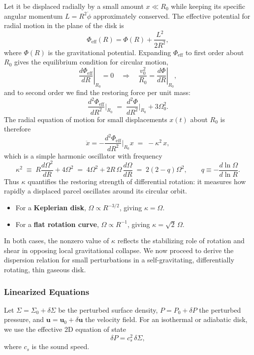 Let it be displaced radially by a small amount $x \ll R_0$ while keeping its specific angular momentum $L = R^2\dot{\phi}$ approximately conserved. The effective potential for radial motion in the plane of the disk is
\[
\Phi_{\text{eff}}(R) = \Phi(R) + \frac{L^2}{2R^2},
\]
where $\Phi(R)$ is the gravitational potential.  
Expanding $\Phi_{\text{eff}}$ to first order about $R_0$ gives the equilibrium condition for circular motion,
\[
\left.\frac{d\Phi_{\text{eff}}}{dR}\right|_{R_0} = 0 
\quad\Rightarrow\quad
\frac{v_0^2}{R_0} = \left.\frac{d\Phi}{dR}\right|_{R_0},
\]
and to second order we find the restoring force per unit mass:
\[
\frac{d^2\Phi_{\text{eff}}}{dR^2}\Big|_{R_0} \;=\;
\frac{d^2\Phi}{dR^2}\Big|_{R_0} + 3\Omega_0^2.
\]
The radial equation of motion for small displacements $x(t)$ about $R_0$ is therefore
\[
\ddot{x} = - \frac{d^2\Phi_{\text{eff}}}{dR^2}\Big|_{R_0} x
\;=\; -\kappa^2\,x,
\]
which is a simple harmonic oscillator with frequency
\[
\boxed{\kappa^2 \;\equiv\; R\frac{d\Omega^2}{dR} + 4\Omega^2
\;=\; 4\Omega^2 + 2R\,\Omega\,\frac{d\Omega}{dR}
\;=\; 2(2-q)\Omega^2, \qquad q \equiv -\frac{d\ln\Omega}{d\ln R}.}
\]
Thus $\kappa$ quantifies the restoring strength of differential rotation: 
it measures how rapidly a displaced parcel oscillates around its circular orbit.

\begin{itemize}
    \item For a \textbf{Keplerian disk}, $\Omega\propto R^{-3/2}$, giving $\kappa=\Omega$.
    \item For a \textbf{flat rotation curve}, $\Omega\propto R^{-1}$, giving $\kappa=\sqrt{2}\,\Omega$.
\end{itemize}
In both cases, the nonzero value of $\kappa$ reflects the stabilizing role of rotation and shear in opposing local gravitational collapse.
\vspace{10pt}
\noindent
We now proceed to derive the dispersion relation for small perturbations in a self-gravitating, differentially rotating, thin gaseous disk.

\subsubsection*{Linearized Equations}

Let $\Sigma = \Sigma_0 + \delta\Sigma$ be the perturbed surface density, $P = P_0 + \delta P$ the perturbed pressure, and $\mathbf{u} = \mathbf{u}_0 + \delta\mathbf{u}$ the velocity field.  
For an isothermal or adiabatic disk, we use the effective 2D equation of state
\[
\delta P = c_s^2\,\delta\Sigma,
\]
where $c_s$ is the sound speed.  

